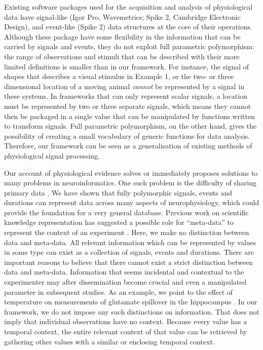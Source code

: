 Existing software packages used for the acquisition and analysis of
physiological data have signal-like (Igor Pro, Wavemetrics; Spike 2,
Cambridge Electronic Design), and event-like (Spike 2) data structures
at the core of their operations. Although these package have some
flexibility in the information that can be carried by signals and
events, they do not exploit full parametric polymorphism: the range of
observations and stimuli that can be described with their more limited
definitions is smaller than in our framework. For instance, the signal
of shapes that describes a visual stimulus in Example 1, or the two-
or three dimensional location of a moving animal \emph{cannot} be
represented by a signal in these systems. In frameworks that can only
represent scalar signals, a location must be represented by two or
three separate signals, which means they cannot then be packaged in a
single value that can be manipulated by functions written to transform
signals. Full parametric polymorphism, on the other hand, gives the
possibility of creating a small vocabulary of generic functions for
data analysis. Therefore, our framework can be seen as a
generalisation of existing methods of physiological signal processing.

Our account of physiological evidence solves or immediately proposes
solutions to many problems in neuroinformatics. One such problem is
the difficulty of sharing primary data \citep{Amari2002}. We have
shown that fully polymorphic signals, events and durations can
represent data across many aspects of neurophysiology, which could
provide the foundation for a very general database. Previous work on
scientific knowledge representation has suggested a possible role for
``meta-data'' to represent the context of an experiment
\citep{Bower2009}. Here, we make no distinction between data and
meta-data. All relevant information which can be represented by values
in some type can exist as a collection of signals, events and
durations. There are important reasons to believe that there cannot
exist a strict distinction between data and meta-data. Information that
seems incidental and contextual to the experimenter may after
dissemination become crucial and even a manipulated parameter in
subsequent studies. As an example, we point to the effect of
temperature on measurements of glutamate spillover in the hippocampus
\citep{Kullmann1996, Asztely1997}.  In our framework, we do not impose
any such distinctions on information. That does not imply that
individual observations have no context. Because every value has a
temporal context, the entire relevant context of that value can be
retrieved by gathering other values with a similar or enclosing
temporal context.

